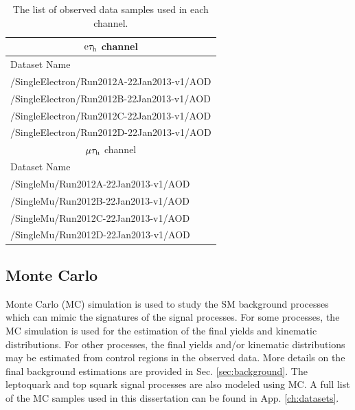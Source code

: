 \begin{table}[hbt]
\begin{center}
\begin{tabular}{|l|}
\multicolumn{1}{c}{$\mathrm{e}\tau_{\text{h}}$ channel} \\
\hline
Dataset Name \\
\hline
/SingleElectron/Run2012A-22Jan2013-v1/AOD \\
/SingleElectron/Run2012B-22Jan2013-v1/AOD \\
/SingleElectron/Run2012C-22Jan2013-v1/AOD \\
/SingleElectron/Run2012D-22Jan2013-v1/AOD \\
\hline
\multicolumn{1}{c}{$\mu\tau_{\text{h}}$ channel} \\ 
\hline
Dataset Name \\
\hline
/SingleMu/Run2012A-22Jan2013-v1/AOD \\
/SingleMu/Run2012B-22Jan2013-v1/AOD \\
/SingleMu/Run2012C-22Jan2013-v1/AOD \\
/SingleMu/Run2012D-22Jan2013-v1/AOD \\
\hline
\end{tabular}
\caption{The list of observed data samples used in each channel.}
\label{tab:data-samples}
\end{center}
\end{table}

\subsection{Monte Carlo}

Monte Carlo (MC) simulation is used to study the SM background processes which can mimic the signatures of the signal processes. For some processes, the MC simulation is used for the estimation of the final yields and kinematic distributions. For other processes, the final yields and/or kinematic distributions may be estimated from control regions in the observed data. More details on the final background estimations are provided in Sec. \ref{sec:background}. The leptoquark and top squark signal processes are also modeled using MC. A full list of the MC samples used in this dissertation can be found in App. \ref{ch:datasets}.

